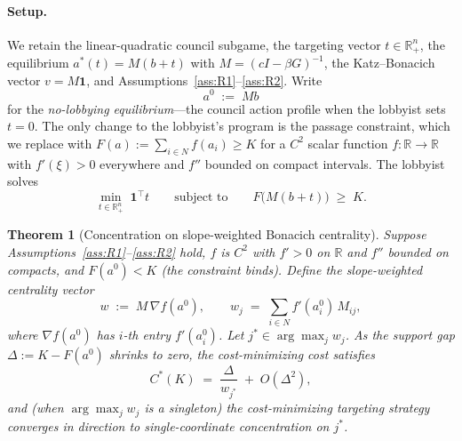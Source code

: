 \documentclass[11pt,letterpaper]{article}
\theoremstyle{plain}
\newtheorem{theorem}{Theorem}
\theoremstyle{definition}
\theoremstyle{remark}
\begin{document}
\paragraph{Setup.} We retain the linear-quadratic council subgame, the targeting vector $t \in \mathbb{R}^n_+$, the equilibrium $a^*(t) = M(b + t)$ with $M = (cI - \beta G)^{-1}$, the Katz--Bonacich vector $v = M\mathbf{1}$, and Assumptions~\ref{ass:R1}--\ref{ass:R2}. Write
\[
a^0 \;:=\; M b
\]
for the \emph{no-lobbying equilibrium}---the council action profile when the lobbyist sets $t = 0$. The only change to the lobbyist's program is the passage constraint, which we replace with $F(a) := \sum_{i \in N} f(a_i) \geq K$ for a $C^2$ scalar function $f : \mathbb{R} \to \mathbb{R}$ with $f'(\xi) > 0$ everywhere and $f''$ bounded on compact intervals. The lobbyist solves
\begin{equation}
\min_{t \in \mathbb{R}^n_+} \;\mathbf{1}^\top t \qquad \text{subject to} \qquad F\bigl(M(b + t)\bigr) \;\geq\; K.
\label{eq:smooth_lobby}
\end{equation}

\begin{theorem}[Concentration on slope-weighted Bonacich centrality]\label{thm:smoothvote}
Suppose Assumptions~\ref{ass:R1}--\ref{ass:R2} hold, $f$ is $C^2$ with $f' > 0$ on $\mathbb{R}$ and $f''$ bounded on compacts, and $F(a^0) < K$ (the constraint binds). Define the \emph{slope-weighted centrality vector}
\[
w \;:=\; M\, \nabla f(a^0), \qquad w_j \;=\; \sum_{i \in N} f'(a^0_i)\, M_{ij},
\]
where $\nabla f(a^0)$ has $i$-th entry $f'(a^0_i)$. Let $j^* \in \arg\max_j w_j$. As the support gap $\Delta := K - F(a^0)$ shrinks to zero, the cost-minimizing cost satisfies
\begin{equation}
C^*(K) \;=\; \frac{\Delta}{w_{j^*}} \;+\; O(\Delta^2),
\label{eq:smoothcost_main}
\end{equation}
and (when $\arg\max_j w_j$ is a singleton) the cost-minimizing targeting strategy converges in direction to single-coordinate concentration on $j^*$.
\end{theorem}
\end{document}
